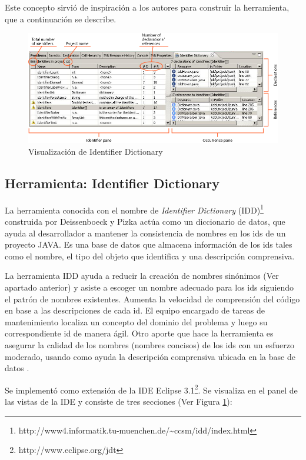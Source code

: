 Este concepto sirvió de inspiración a los autores para construir la herramienta, que a continuación se describe.

\begin{figure}[t!] %
\centerline{%
\includegraphics[scale= 0.55]{./cap3/idd_2.png}
}
\caption{Visualización de Identifier Dictionary}
\label{captura3}
\end{figure}

\pagebreak
\subsection{Herramienta: Identifier Dictionary}
\label{sec:algIdDic}
La herramienta conocida con el nombre de \textit{Identifier Dictionary} (IDD)\footnote[1]{http://www4.informatik.tu-muenchen.de/\~{}ccsm/idd/index.html} construida por Deissenboeck y Pizka \cite{DFPM05} actúa como un diccionario de datos, que ayuda al desarrollador a mantener la consistencia de nombres en los ids de un proyecto JAVA. Es una base de datos que almacena información de los ids tales como el nombre, el tipo del objeto que identifica y una descripción comprensiva.

La herramienta IDD ayuda a reducir la creación de nombres sinónimos (Ver apartado anterior) y asiste a escoger un nombre adecuado para los ids siguiendo el patrón de nombres existentes. Aumenta la velocidad de comprensión del código en base a las descripciones de cada id. El equipo encargado de tareas de mantenimiento localiza un concepto del dominio del problema y luego su correspondiente id de manera ágil. Otro aporte que hace la herramienta es asegurar la calidad de los nombres (nombres concisos) de los ids con un esfuerzo moderado, usando como ayuda la descripción comprensiva ubicada en la base de datos \cite{DFPM05,LFBEX07}.

Se implementó como extensión de la IDE Eclipse 3.1\footnote[2]{http://www.eclipse.org/jdt}. Se visualiza en el panel de las vistas de la IDE y consiste de tres secciones (Ver Figura \ref{captura3}):

